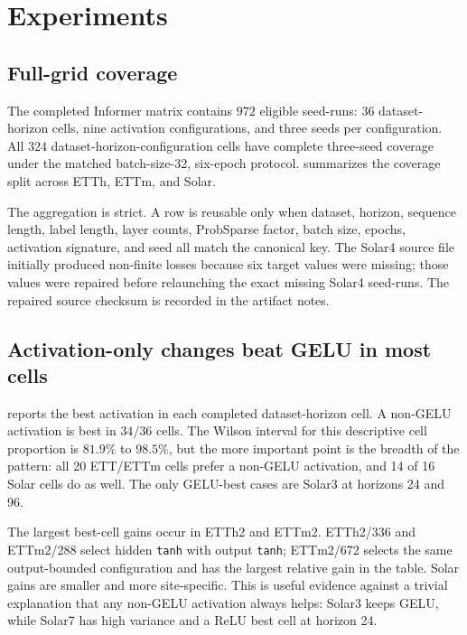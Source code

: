 \section{Experiments}

\subsection{Full-grid coverage}

The completed Informer matrix contains \(972\) eligible seed-runs: 36 dataset-horizon cells, nine activation configurations, and three seeds per configuration. All \(324\) dataset-horizon-configuration cells have complete three-seed coverage under the matched batch-size-32, six-epoch protocol.  summarizes the coverage split across ETTh, ETTm, and Solar.



The aggregation is strict. A row is reusable only when dataset, horizon, sequence length, label length, layer counts, ProbSparse factor, batch size, epochs, activation signature, and seed all match the canonical key. The Solar4 source file initially produced non-finite losses because six target values were missing; those values were repaired before relaunching the exact missing Solar4 seed-runs. The repaired source checksum is recorded in the artifact notes.

\subsection{Activation-only changes beat GELU in most cells}

 reports the best activation in each completed dataset-horizon cell. A non-GELU activation is best in \(34/36\) cells. The Wilson interval for this descriptive cell proportion is \(81.9\%\) to \(98.5\%\), but the more important point is the breadth of the pattern: all 20 ETT/ETTm cells prefer a non-GELU activation, and 14 of 16 Solar cells do as well. The only GELU-best cases are Solar3 at horizons 24 and 96.



The largest best-cell gains occur in ETTh2 and ETTm2. ETTh2/336 and ETTm2/288 select hidden \texttt{tanh} with output \texttt{tanh}; ETTm2/672 selects the same output-bounded configuration and has the largest relative gain in the table. Solar gains are smaller and more site-specific. This is useful evidence against a trivial explanation that any non-GELU activation always helps: Solar3 keeps GELU, while Solar7 has high variance and a ReLU best cell at horizon 24.

